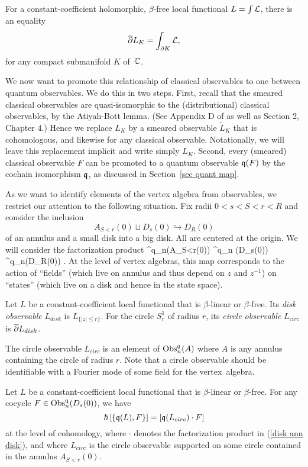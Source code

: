 \begin{lemma}
For a constant-coefficient holomorphic, $\beta$-free local functional $L = \int \mathcal L$,
there is an equality
\[
\overline{\partial} L_K = \int_{\partial K} \mathcal L,
\]
for any compact submanifold $K$ of~$\mathbb C$.
\end{lemma}

We now want to promote this relationship of classical observables to one between quantum observables.
We do this in two steps.
First, recall that the smeared classical observables are quasi-isomorphic to the (distributional) classical observables,
by the Atiyah-Bott lemma. (See Appendix D of \cite{CG} as well as Section 2, Chapter 4.)
Hence we replace $L_K$ by a smeared observable $\widetilde{L}_K$ that is cohomologous, and likewise for any classical observable.
Notationally, we will leave this replacement implicit and write simply $L_K$.
Second, every (smeared) classical observable $F$ can be promoted to a quantum observable $\frak{q}(F)$ 
by the cochain isomorphism $\frak{q}$, as discussed in Section~\ref{sec quant map}.

As we want to identify elements of the vertex algebra from observables,
we restrict our attention to the following situation.
Fix radii $0 < s < S < r <R$ and
consider the inclusion 
\[
A_{S<r}(0) \sqcup D_s(0) \hookrightarrow D_R(0)
\]
of an annulus and a small disk into a big disk.
All are centered at the origin. We will consider the factorization product 
\be\label{disk ann disk}
\Obs^q_n(A_{S<r}(0)) \tensor \Obs^q_n (D_s(0)) \to \Obs^q_n(D_R(0)) .
\ee
At the level of vertex algebras, this map corresponds to the action of ``fields'' (which live on annulus and thus depend on $z$ and $z^{-1}$) on ``states'' (which live on a disk and hence in the state space).

\begin{dfn}
Let $L$ be a constant-coefficient local functional that is $\beta$-linear or $\beta$-free.
Its {\em disk observable} $L_{disk}$ is $L_{\{|z| \leq r\}}$. For the circle $S^1_r$ of radius $r$, its {\em circle observable} $L_{circ}$ is $\overline{\partial} L_{disk}$.
\end{dfn}

The circle observable $L_{circ}$ is an element of ${\rm Obs}^q_{n}(A)$ where $A$ is any annulus containing the circle of radius $r$. Note that a circle observable should be identifiable with a Fourier mode of some field for the vertex~algebra.

\begin{lemma}
\label{der vs star}
Let $L$ be a constant-coefficient local functional that is $\beta$-linear or $\beta$-free.
For any cocycle $F \in {\rm Obs}^{\rm q}_n(D_s(0))$, we have
\[
\hbar \left[ \{\frak{q}(L) , F\} \right] = \left[\frak{q}(L_{circ}) \cdot F\right]
\]
at the level of cohomology, where $\cdot$ denotes the factorization product in (\ref{disk ann disk}), and where $L_{circ}$ is the circle observable supported on some circle contained in the annulus $A_{S<r}(0)$.
\end{lemma}

